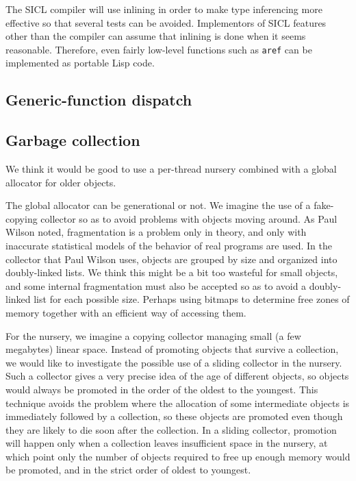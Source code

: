 \documentclass{article}
\begin{document}
The SICL compiler will use inlining in order to make type inferencing
more effective so that several tests can be avoided.  Implementors of
SICL features other than the compiler can assume that inlining is done
when it seems reasonable.  Therefore, even fairly low-level functions
such as \texttt{aref} can be implemented as portable Lisp code. 

\subsection{Generic-function dispatch}

\subsection{Garbage collection}

We think it would be good to use a per-thread nursery combined with a
global allocator for older objects.

The global allocator can be generational or not.  We imagine the use
of a fake-copying collector so as to avoid problems with objects
moving around.  As Paul Wilson noted, fragmentation is a problem only
in theory, and only with inaccurate statistical models of the behavior
of real programs are used.  In the collector that Paul Wilson uses,
objects are grouped by size and organized into doubly-linked lists.
We think this might be a bit too wasteful for small objects, and some
internal fragmentation must also be accepted so as to avoid a
doubly-linked list for each possible size.  Perhaps using bitmaps to
determine free zones of memory together with an efficient way of
accessing them.

For the nursery, we imagine a copying collector managing small (a few
megabytes) linear space.  Instead of promoting objects that survive a
collection, we would like to investigate the possible use of a sliding
collector in the nursery.  Such a collector gives a very precise idea
of the age of different objects, so objects would always be promoted
in the order of the oldest to the youngest.  This technique avoids the
problem where the allocation of some intermediate objects is
immediately followed by a collection, so these objects are promoted
even though they are likely to die soon after the collection.  In a
sliding collector, promotion will happen only when a collection leaves
insufficient space in the nursery, at which point only the number of
objects required to free up enough memory would be promoted, and in
the strict order of oldest to youngest. 
\end{document}
